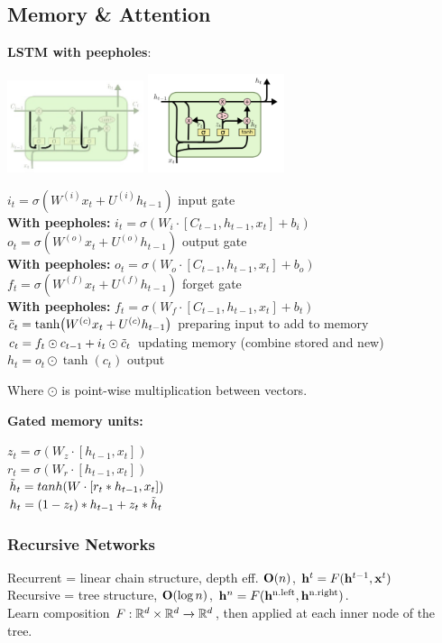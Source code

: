 \subsection{Memory \& Attention}
\label{sub:memoryandattention}
    \textbf{LSTM with peepholes}:
    
    \includegraphics[width=4cm]{images/lstm-peepholes.png}
    \includegraphics[width=4cm]{images/gru.png}

    
    \tab $i_t=\sigma(W^{(i)}x_t+U^{(i)}h_{t-1})$ input gate\\
\textbf{With peepholes:} $i_t=\sigma(W_i\cdot [C_{t-1},h_{t-1}, x_t]+b_i)$\\
    \tab $o_t=\sigma(W^{(o)}x_t+U^{(o)}h_{t-1})$ output gate \\
\textbf{With peepholes:} $o_t=\sigma(W_o\cdot [C_{t-1},h_{t-1}, x_t]+b_o)$\\
    \tab $f_t=\sigma(W^{(f)}x_t+U^{(f)}h_{t-1})$ forget gate\\
\textbf{With peepholes:} $f_t=\sigma(W_f\cdot [C_{t-1},h_{t-1}, x_t]+b_t)$\\
    \tab $\Tilde{c}_t=\tanh(W^{(c)}x_t+U^{(c)}h_{t-1})$ preparing input to add to memory\\
    \tab $c_t=f_t\odot c_{t-1}+i_t\odot \Tilde{c}_t$ updating memory (combine stored and new)\\
    \tab $h_t=o_t\odot\tanh(c_t)$ output
    
    Where $\odot$ is point-wise multiplication between vectors.
    
    \textbf{Gated memory units:}
    
    $z_t=\sigma(W_z \cdot [h_{t-1},x_t])$\\
    $r_t=\sigma(W_r \cdot [h_{t-1},x_t])$\\
    $\Tilde{h}_t=tanh(W \cdot [r_t * h_{t-1},x_t])$\\
    $h_t=(1-z_t)*h_{t-1}+z_t*\Tilde{h}_t$

    
    \subsubsection{Recursive Networks}
    \label{ssub:recursivenetworks}
    Recurrent = linear chain structure, depth eff. $\mathbf O(n)$, $\mathbf h^t=F(\mathbf h^{t-1},\mathbf x^t)$\\
    Recursive = tree structure, $\mathbf O(\log n)$, $\mathbf h^n=F(\mathbf h^\text{n.left},\mathbf h^\text{n.right})$.\\
    Learn composition $F:\mathbb R^d\times\mathbb R^d\xrightarrow{}\mathbb R^d$, then applied at each inner node of the tree.
